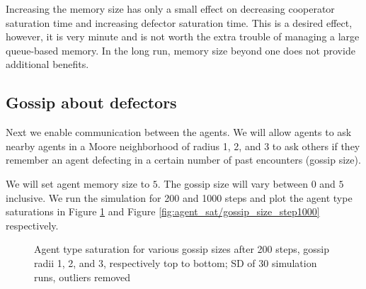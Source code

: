 \documentclass[english]{article}
\begin{document}
Increasing the memory size has only a small effect on decreasing cooperator saturation time and increasing defector saturation time.
This is a desired effect, however, it is very minute and is not worth the extra trouble of managing a large queue-based memory.
In the long run, memory size beyond one does not provide additional benefits.


\subsection{Gossip about defectors}
Next we enable communication between the agents.
We will allow agents to ask nearby agents in a Moore neighborhood of radius 1, 2, and 3 to ask others if they remember an agent defecting in a certain number of past encounters (gossip size).

We will set agent memory size to $5$.
The gossip size will vary between $0$ and $5$ inclusive.
We run the simulation for 200 and 1000 steps and plot the agent type saturations in Figure \ref{fig:agent_sat/gossip_size_step200} and Figure \ref{fig:agent_sat/gossip_size_step1000} respectively.

\begin{figure}[!h]
  \centering
  \caption{Agent type saturation for various gossip sizes after 200 steps, gossip radii 1, 2, and 3, respectively top to bottom; SD of 30 simulation runs, outliers removed}
  \label{fig:agent_sat/gossip_size_step200}
\end{figure}
\end{document}
